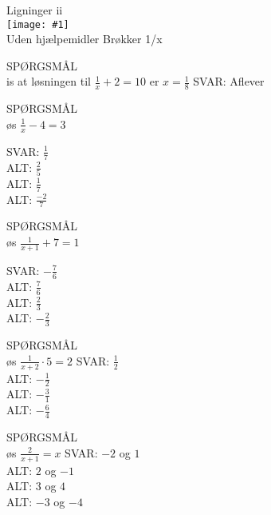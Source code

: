 \documentclass[]{article}
\newcounter{spgcounter}
\newenvironment{question}[2]{\addtocounter{spgcounter}{1} SPØRGSMÅL \thespgcounter\\ }{\hspace{50px}}
\newcommand{\name}[1]{{\huge #1}\\}
\newcommand{\tag}[1]{#1}
\newcommand{\cover}[1]{\texttt{[image: \#1]}\\}
\newcommand{\answer}[1]{{\color{green} SVAR: #1}\\}
\newcommand{\alt}[1]{{\color{red} ALT: #1}\\}
\begin{document}
\name{Ligninger ii}
\cover{brøkkerligninger.png}
\tag{Uden hjælpemidler}
\tag{Brøkker}
\tag{1/x}

\begin{question}{multi}
Vis at løsningen til $\frac{1}{x} + 2 = 10$ er $x=\frac{1}{8}$
\answer{Aflever}
\end{question}

\begin{question}{multi}
Løs $\frac{1}{x} - 4 = 3$

\answer{$\frac{1}{7}$}
\alt{$\frac{2}{5}$}
\alt{$\frac{1}{7}$}
\alt{$\frac{-2}{7}$}
\end{question}

\begin{question}{multi}
Løs $\frac{1}{x+1} + 7 = 1$

\answer{$-\frac{7}{6}$}
\alt{$\frac{7}{6}$}
\alt{$\frac{2}{3}$}
\alt{$-\frac{2}{3}$}
\end{question}

\begin{question}{multi}
Løs $\frac{1}{x+2} \cdot 5 = 2$
\answer{$\frac{1}{2}$}
\alt{$-\frac{1}{2}$}
\alt{$-\frac{3}{1}$}
\alt{$-\frac{6}{4}$}
\end{question}

\begin{question}{multi}
Løs $\frac{2}{x+1} = x$
\answer{$-2$ og $1$}
\alt{$2$ og $-1$}
\alt{$3$ og $4$}
\alt{$-3$ og $-4$}

\end{question}
\end{document}
